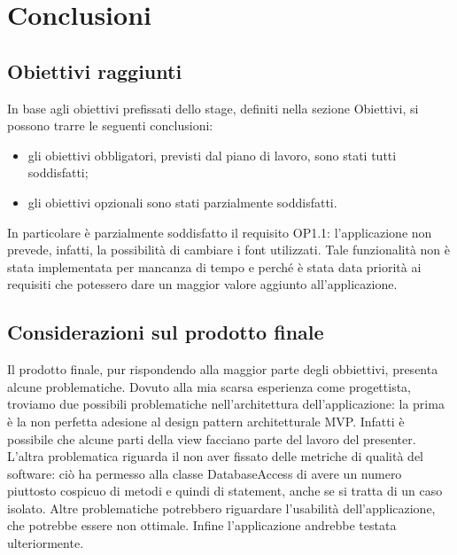 \documentclass[../Tesi.tex]{subfiles}
\begin{document}
\section{Conclusioni}
	\subsection{Obiettivi raggiunti}
	In base agli obiettivi prefissati dello stage, definiti nella sezione Obiettivi, si possono trarre le seguenti conclusioni:
	\begin{itemize}
		\item gli obiettivi obbligatori, previsti dal piano di lavoro, sono stati tutti soddisfatti;
		\item gli obiettivi opzionali sono stati parzialmente soddisfatti.
	\end{itemize}
	In particolare è parzialmente soddisfatto il requisito OP1.1: l'applicazione non prevede, infatti, la possibilità di cambiare i font utilizzati. Tale funzionalità non è stata implementata per mancanza di tempo e perché è stata data priorità ai requisiti che potessero dare un maggior valore aggiunto all'applicazione.

	\subsection{Considerazioni sul prodotto finale}
	Il prodotto finale, pur rispondendo alla maggior parte degli obbiettivi, presenta alcune problematiche. Dovuto alla mia scarsa esperienza come progettista, troviamo due possibili problematiche nell'architettura dell'applicazione: la prima è la non perfetta adesione al design pattern architetturale MVP. Infatti è possibile che alcune parti della view facciano parte del lavoro del presenter. L'altra problematica riguarda il non aver fissato delle metriche di qualità del software: ciò ha permesso alla classe DatabaseAccess di avere un numero piuttosto cospicuo di metodi e quindi di statement, anche se si tratta di un caso isolato. Altre problematiche potrebbero riguardare l'usabilità dell'applicazione, che potrebbe essere non ottimale. Infine l'applicazione andrebbe testata ulteriormente.
\end{document}
